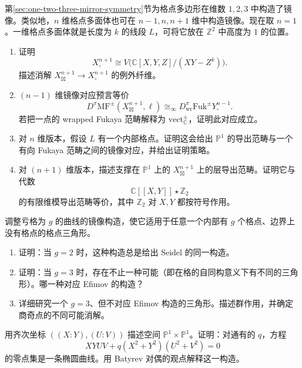 \begin{exercise}\label{exer:one-polytope-three-dimensions}
第\ref{sec:one-two-three-mirror-symmetry}节为格点多边形在维数 $1,2,3$ 中构造了镜像。类似地，$n$ 维格点多面体也可在 $n-1,n,n+1$ 维中构造镜像。现在取 $n=1$。一维格点多面体就是长度为 $k$ 的线段 $L$，可将它放在 $\mathbb Z^2$ 中高度为 $1$ 的位置。
\begin{enumerate}[label=(\roman*)]
  \item 证明
  \[
    X^{n+1}_\square\cong V\bigl(\mathbb C[X,Y,Z]/(XY-Z^k)\bigr).
  \]
  描述消解 $X^{n+1}_{\boxtimes}\to X^{n+1}_\square$ 的例外纤维。
  \item $(n-1)$ 维镜像对应预言等价
  \[
    D^\pi\mathrm{MF}^{\pm}(X^{n+1}_{\boxtimes},\ell)
    \cong_\infty D^\pi_{\mathrm{wr}}\mathrm{Fuk}^{\pm}Y^{n-1}_\square.
  \]
  若把一点的 wrapped Fukaya 范畴解释为 $\mathrm{vect}^{\pm}_{\mathbb C}$，证明此对应成立。
  \item 对 $n$ 维版本，假设 $L$ 有一个内部格点。证明这会给出 $\mathbb P^1$ 的导出范畴与一个有向 Fukaya 范畴之间的镜像对应，并给出证明策略。
  \item 对 $(n+1)$ 维版本，描述支撑在 $\mathbb P^1$ 上的 $X^{n+1}_{\boxtimes}$ 上的层导出范畴。证明它与代数
  \[
    \mathbb C[[X,Y]]\star\mathbb Z_2
  \]
  的有限维模导出范畴等价，其中 $\mathbb Z_2$ 对 $X,Y$ 都按符号作用。
\end{enumerate}
\end{exercise}

\begin{exercise}\label{exer:genus-g-toric-triangle}
调整亏格为 $g$ 的曲线的镜像构造，使它适用于任意一个内部有 $g$ 个格点、边界上没有格点的格点三角形。
\begin{enumerate}[label=(\roman*)]
  \item 证明：当 $g=2$ 时，这种构造总是给出 Seidel 的同一构造。
  \item 证明：当 $g=3$ 时，存在不止一种可能（即在格的自同构意义下有不同的三角形）。哪一种对应 Efimov 的构造？
  \item 详细研究一个 $g=3$、但不对应 Efimov 构造的三角形。描述群作用，并确定商奇点的不同可能消解。
\end{enumerate}
\end{exercise}

\begin{exercise}\label{exer:batyrev-elliptic-curve-p1-p1}
用齐次坐标 $((X:Y),(U:V))$ 描述空间 $\mathbb P^1\times\mathbb P^1$。证明：对通有的 $q$，方程
\[
  XYUV+q(X^2+Y^2)(U^2+V^2)=0
\]
的零点集是一条椭圆曲线。用 Batyrev 对偶的观点解释这一构造。
\end{exercise}


